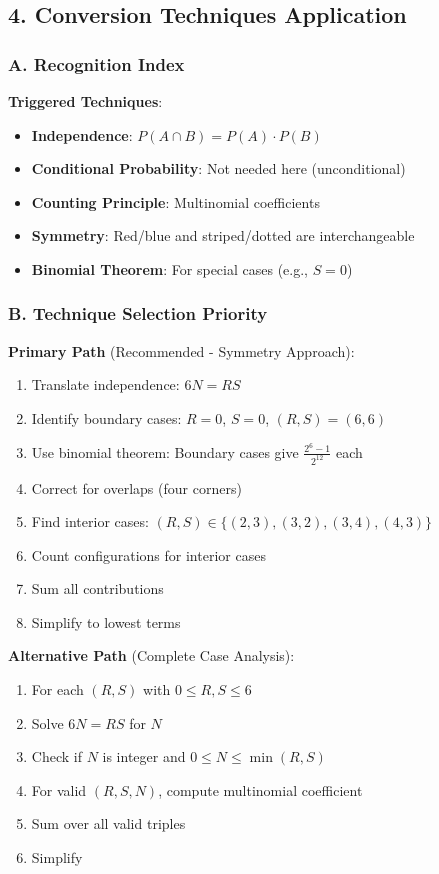 \documentclass[12pt]{article}
\begin{document}
\begin{techniquesbox}
\subsection*{4. Conversion Techniques Application}

\subsubsection*{A. Recognition Index}

\textbf{Triggered Techniques}:
\begin{itemize}
    \item \textbf{Independence}: $P(A \cap B) = P(A) \cdot P(B)$
    \item \textbf{Conditional Probability}: Not needed here (unconditional)
    \item \textbf{Counting Principle}: Multinomial coefficients
    \item \textbf{Symmetry}: Red/blue and striped/dotted are interchangeable
    \item \textbf{Binomial Theorem}: For special cases (e.g., $S = 0$)
\end{itemize}

\subsubsection*{B. Technique Selection Priority}

\textbf{Primary Path} (Recommended - Symmetry Approach):
\begin{enumerate}
    \item Translate independence: $6N = RS$
    \item Identify boundary cases: $R = 0$, $S = 0$, $(R,S) = (6,6)$
    \item Use binomial theorem: Boundary cases give $\frac{2^6 - 1}{2^{12}}$ each
    \item Correct for overlaps (four corners)
    \item Find interior cases: $(R, S) \in \{(2,3), (3,2), (3,4), (4,3)\}$
    \item Count configurations for interior cases
    \item Sum all contributions
    \item Simplify to lowest terms
\end{enumerate}

\textbf{Alternative Path} (Complete Case Analysis):
\begin{enumerate}
    \item For each $(R, S)$ with $0 \leq R, S \leq 6$
    \item Solve $6N = RS$ for $N$
    \item Check if $N$ is integer and $0 \leq N \leq \min(R, S)$
    \item For valid $(R, S, N)$, compute multinomial coefficient
    \item Sum over all valid triples
    \item Simplify
\end{enumerate}


\end{techniquesbox}
\end{document}

